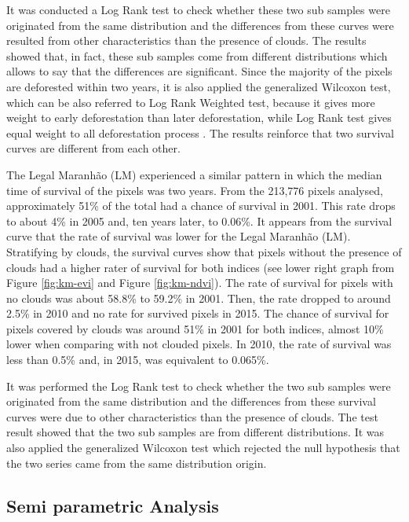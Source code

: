 
It was conducted a Log Rank test \citep{Peto_1972} to check whether these two sub samples were originated from the same distribution and the differences from these curves were resulted from other characteristics than the presence of clouds. The results showed that, in fact, these sub samples come from different distributions which allows to say that the differences are significant. Since the majority of the pixels are deforested within two years, it is also applied the generalized Wilcoxon test, which can be also referred to Log Rank Weighted test, because it gives more weight to early deforestation than later deforestation, while Log Rank test gives equal weight to all deforestation process \citep{lee_wang_2003}. The results reinforce that two survival curves are different from each other.

The Legal Maranhão (LM) experienced a similar pattern in which the median time of survival of the pixels was two years. From the 213,776 pixels analysed, approximately 51\% of the total had a chance of survival in 2001. This rate drops to about 4\% in 2005 and, ten years later, to 0.06\%. It appears from the survival curve that the rate of survival was lower for the Legal Maranhão (LM). Stratifying by clouds, the survival curves show that pixels without the presence of clouds had a higher rater of survival for both indices (see lower right graph from Figure \ref{fig:km-evi} and Figure \ref{fig:km-ndvi}). The rate of survival for pixels with no clouds was about 58.8\% to 59.2\% in 2001. Then, the rate dropped to around 2.5\% in 2010 and no rate for survived pixels in 2015. The chance of survival for pixels covered by clouds was around 51\% in 2001 for both indices, almost 10\% lower when comparing with not clouded pixels. In 2010, the rate of survival was less than 0.5\% and, in 2015, was equivalent to 0.065\%. 

It was performed the Log Rank test \citep{Peto_1972} to check whether the two sub samples were originated from the same distribution and the differences from these survival curves were due to other characteristics than the presence of clouds. The test result showed that the two sub samples are from different distributions. It was also applied the generalized Wilcoxon test \citep{lee_wang_2003} which rejected the null hypothesis that the two series came from the same distribution origin. 

\subsection{Semi parametric Analysis} \label{resultssection2}

